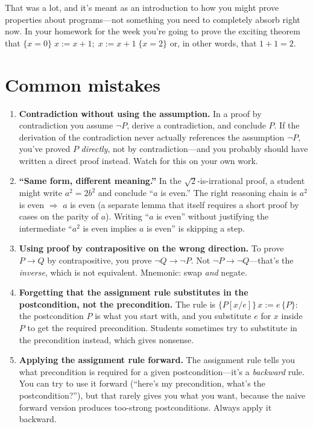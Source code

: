 \documentclass[11pt]{article}
\begin{document}
\medskip
That was a lot, and it's meant as an introduction to how you might prove properties about programs---not something you need to completely absorb right now. In your homework for the week you're going to prove the exciting theorem that $\{x = 0\}\;x := x+1;\; x := x+1\;\{x = 2\}$ or, in other words, that $1 + 1 = 2$.

\section{Common mistakes}

\begin{enumerate}
  \item \textbf{Contradiction without using the assumption.} In a proof by contradiction you assume $\lnot P$, derive a contradiction, and conclude $P$. If the derivation of the contradiction never actually references the assumption $\lnot P$, you've proved $P$ \emph{directly}, not by contradiction---and you probably should have written a direct proof instead. Watch for this on your own work.
  \item \textbf{``Same form, different meaning.''} In the $\sqrt{2}$-is-irrational proof, a student might write $a^2 = 2b^2$ and conclude ``$a$ is even.'' The right reasoning chain is $a^2$ is even $\Rightarrow$ $a$ is even (a separate lemma that itself requires a short proof by cases on the parity of $a$). Writing ``$a$ is even'' without justifying the intermediate ``$a^2$ is even implies $a$ is even'' is skipping a step.
  \item \textbf{Using proof by contrapositive on the wrong direction.} To prove $P \to Q$ by contrapositive, you prove $\lnot Q \to \lnot P$. Not $\lnot P \to \lnot Q$---that's the \emph{inverse}, which is not equivalent. Mnemonic: swap \emph{and} negate.
  \item \textbf{Forgetting that the assignment rule substitutes in the postcondition, not the precondition.} The rule is $\{P[x/e]\}\, x := e\, \{P\}$: the postcondition $P$ is what you start with, and you substitute $e$ for $x$ inside $P$ to get the required precondition. Students sometimes try to substitute in the precondition instead, which gives nonsense.
  \item \textbf{Applying the assignment rule forward.} The assignment rule tells you what precondition is required for a given postcondition---it's a \emph{backward} rule. You can try to use it forward (``here's my precondition, what's the postcondition?''), but that rarely gives you what you want, because the naive forward version produces too-strong postconditions. Always apply it backward.

\end{enumerate}
\end{document}
